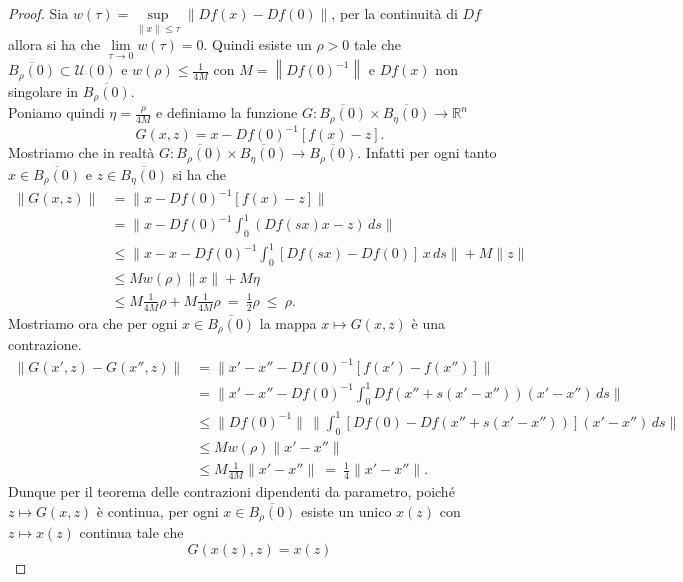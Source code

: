 \begin{proof}
Sia $w(\tau)= \sup\limits_{\|x\|\leq\tau}\|Df(x)-Df(0)\|$, per la continuità di $Df$ allora si ha che $\lim\limits_{\tau\rightarrow 0}w(\tau)=0.$ Quindi esiste un $\rho >0$ tale che $\overline{B_{\rho}(0)}\subset\mathcal{U}(0)$ e $w(\rho)\leq\frac{1}{4M}$ con $M = \left\|Df(0)^{-1}\right\|$ e $Df(x)$ non singolare in $\overline{B_{\rho}(0)}$.\\
Poniamo quindi $\eta = \frac{\rho}{4M}$ e definiamo la funzione $G:\overline{B_{\rho}(0)}\times\overline{B_{\eta}(0)}\rightarrow\mathbb{R}^{n}$ 
\begin{equation*}
G(x,z)=x-Df(0)^{-1}\left[f(x)-z\right].
\end{equation*}
Mostriamo che in realtà $G:\overline{B_{\rho}(0)}\times\overline{B_{\eta}(0)}\rightarrow\overline{B_{\rho}(0)}$. Infatti per ogni tanto $x\in\overline{B_{\rho}(0)}$ e $z\in\overline{B_{\eta}(0)}$ si ha che
\begin{align*}
\|G(x,z)\| & = \|x-Df(0)^{-1}\left[f(x)-z\right]\| \\
         & = \|x-Df(0)^{-1}\int_{0}^{1}(Df(sx)x-z) \, ds\|  \\
         & \leq \|x-x-Df(0)^{-1}\int_{0}^{1}[Df(sx)-Df(0)]\,x \, ds\| + M\|z\| \\
         & \leq Mw(\rho)\|x\|+M\eta \\ 
         & \leq M\frac{1}{4M}\rho+M\frac{1}{4M}\rho \ = \ \frac{1}{2}\rho \ \le \ \rho.
\end{align*}
Mostriamo ora che per ogni $x\in\overline{B_{\rho}(0)}$ la mappa $x\mapsto G(x,z)$ è una contrazione.
\begin{align*}
\|G(x',z)-G(x'',z)\| & = \|x'-x''-Df(0)^{-1}[f(x')-f(x'')]\| \\
                   & = \|x'-x''-Df(0)^{-1}\int_{0}^{1}Df(x''+s(x'-x''))(x'-x'') \, ds\| \\
                   & \leq \| Df(0)^{-1}\| \, \| \int_{0}^{1}[ Df(0) - Df(x'' + s(x'-x''))](x'-x'')\, ds\| \\
                   & \leq Mw(\rho)\|x'-x''\| \\
                   & \leq M\frac{1}{4M}\|x'-x''\| \ = \ \frac{1}{4}\|x'-x''\|.
\end{align*}
Dunque per il teorema delle contrazioni dipendenti da parametro, poiché $z\mapsto G(x,z)$ è continua, per ogni $x\in\overline{B_{\rho}(0)}$ esiste un unico $x(z)$ con $z\mapsto x(z)$ continua tale che
\begin{equation*}
G(x(z),z)=x(z)
\end{equation*}

\end{proof}
